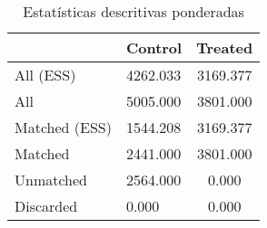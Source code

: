 \begin{table}

\caption{\label{tab:PSM}Estatísticas descritivas ponderadas}
\centering
\begin{tabular}[t]{llc}
\toprule
  & Control & Treated\\
\midrule
All (ESS) & 4262.033 & 3169.377\\
All & 5005.000 & 3801.000\\
Matched (ESS) & 1544.208 & 3169.377\\
Matched & 2441.000 & 3801.000\\
Unmatched & 2564.000 & 0.000\\
\addlinespace
Discarded & 0.000 & 0.000\\
\bottomrule
\end{tabular}
\end{table}
